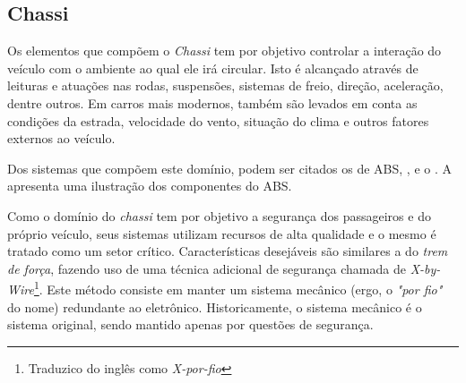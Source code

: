 
%

\subsection{Chassi}

Os elementos que compõem o \emph{Chassi} tem por objetivo controlar a interação do veículo com o ambiente ao qual ele irá circular. Isto é alcançado através de leituras e atuações nas rodas, suspensões, sistemas de freio, direção, aceleração, dentre outros. Em carros mais modernos, também são levados em conta as condições da estrada, velocidade do vento, situação do clima e outros fatores externos ao veículo.

Dos sistemas que compõem este domínio, podem ser citados os de ABS, ,  e o . A  apresenta uma ilustração dos componentes do ABS.


Como o domínio do \emph{chassi} tem por objetivo a segurança dos passageiros e do próprio veículo, seus sistemas utilizam recursos de alta qualidade e o mesmo é tratado como um setor crítico. Características desejáveis são similares a do \emph{trem de força}, fazendo uso de uma técnica adicional de segurança chamada de \emph{X-by-Wire}\footnote{Traduzico do inglês como \emph{X-por-fio}}. Este método consiste em manter um sistema mecânico (ergo, o \emph{"por fio"} do nome) redundante ao eletrônico. Historicamente, o sistema mecânico é o sistema original, sendo mantido apenas por questões de segurança.

